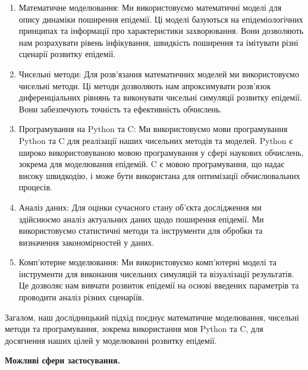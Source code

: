 \begin{enumerate}
    \item Математичне моделювання: Ми використовуємо математичні моделі для опису динаміки поширення епідемії. Ці моделі базуються на епідеміологічних принципах та інформації про характеристики захворювання. Вони дозволяють нам розрахувати рівень інфікування, швидкість поширення та імітувати різні сценарії розвитку епідемії.

    \item Чисельні методи: Для розв'язання математичних моделей ми використовуємо чисельні методи. Ці методи дозволяють нам апроксимувати розв'язок диференціальних рівнянь та виконувати чисельні симуляції розвитку епідемії. Вони забезпечують точність та ефективність обчислень.

    \item Програмування на Python та C: Ми використовуємо мови програмування Python та C для реалізації наших чисельних методів та моделей. Python є широко використовуваною мовою програмування у сфері наукових обчислень, зокрема для моделювання епідемій. C є мовою програмування, що надає високу швидкодію, і може бути використана для оптимізації обчислювальних процесів.

    \item Аналіз даних: Для оцінки сучасного стану об'єкта дослідження ми здійснюємо аналіз актуальних даних щодо поширення епідемії. Ми використовуємо статистичні методи та інструменти для обробки та визначення закономірностей у даних.

    \item Комп'ютерне моделювання: Ми використовуємо комп'ютерні моделі та інструменти для виконання чисельних симуляцій та візуалізації результатів. Це дозволяє нам вивчати розвиток епідемії на основі введених параметрів та проводити аналіз різних сценаріїв.

\end{enumerate}
Загалом, наш дослідницький підхід поєднує математичне моделювання, чисельні методи та програмування, зокрема використання мов Python та C, для досягнення наших цілей у моделюванні розвитку епідемії.

\textbf{Можливі сфери застосування.}



